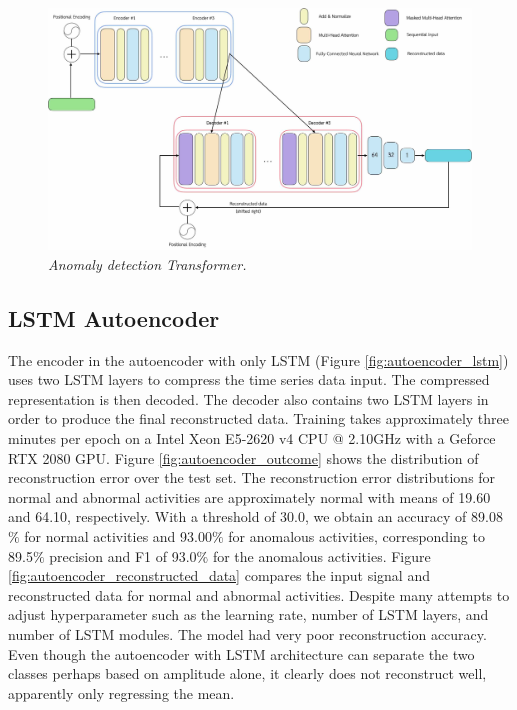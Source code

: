 \begin{figure}[H]
  \centering
  \caption[Anomaly detection Transformer.]{\emph{Anomaly detection Transformer.}} \label{fig:transformer_1}
  \includegraphics[scale = 0.15]{figures/transformer_job.jpg}
\end{figure}

\subsection{LSTM Autoencoder}
The encoder in the autoencoder with only LSTM (Figure \ref{fig:autoencoder_lstm}) uses two LSTM layers to compress the time series data input. The compressed representation is then decoded. The decoder also contains two LSTM layers in order to produce the final reconstructed data. Training takes approximately three minutes per epoch on a Intel Xeon E5-2620 v4 CPU @ 2.10GHz with a Geforce RTX 2080 GPU. Figure \ref{fig:autoencoder_outcome} shows the distribution of reconstruction error over the test set. The reconstruction error distributions for normal and abnormal activities are approximately normal with means of 19.60 and 64.10, respectively. With a threshold of 30.0, we obtain an accuracy of 89.08$\%$ for normal activities and 93.00$\%$ for anomalous activities, corresponding to 89.5$\%$ precision and F1 of 93.0$\%$ for the anomalous activities. Figure \ref{fig:autoencoder_reconstructed_data} compares the input signal and reconstructed data for normal and abnormal activities. Despite many attempts to adjust hyperparameter such as the learning rate, number of LSTM layers, and number of LSTM modules. The model had very poor reconstruction accuracy. Even though the autoencoder with LSTM architecture can separate the two classes perhaps based on amplitude alone, it clearly does not reconstruct well, apparently only regressing the mean.

